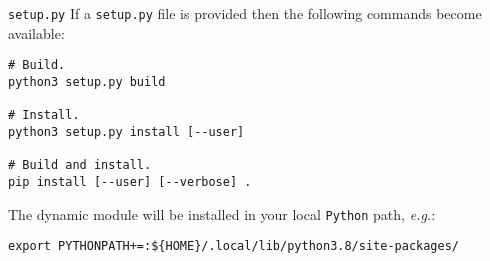 \documentclass[aspectratio=169,11pt]{beamer}
\begin{document}
\begin{frame}[fragile]{\texttt{setup.py}}
    If a \texttt{setup.py} file is provided then the following commands become available:
    \begin{verbatim}
# Build.
python3 setup.py build

# Install.
python3 setup.py install [--user]

# Build and install.
pip install [--user] [--verbose] .
    \end{verbatim}
    The dynamic module will be installed in your local \texttt{Python} path, \textit{e.g.}:
{
    \small
    \begin{verbatim}
export PYTHONPATH+=:${HOME}/.local/lib/python3.8/site-packages/
    \end{verbatim}
}
\end{frame}
\end{document}
